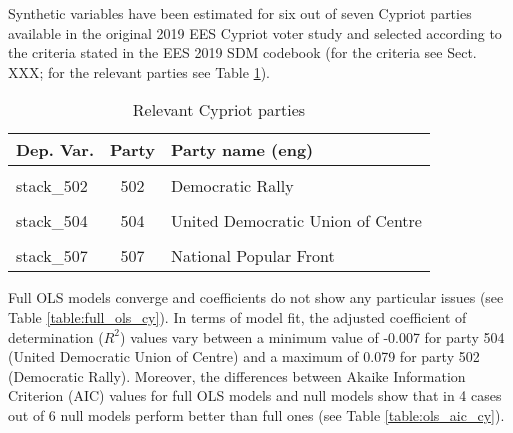 \documentclass[
]{article}
\begin{document}
Synthetic variables have been estimated for six out of seven Cypriot parties available in the original
2019 EES Cypriot voter study and selected according to the criteria stated in the EES 2019 SDM codebook (for the criteria see Sect. XXX; for the relevant parties see Table \ref{table:relprty_tab_cy}).

\begin{table}[!h]

\caption{\label{tab:unnamed-chunk-39}Relevant Cypriot parties \label{table:relprty_tab_cy}}
\centering
\begin{tabular}[t]{lcl}
\toprule
Dep. Var. & Party & Party name (eng)\\
\midrule
\cellcolor{gray!6}{stack\_501} & \cellcolor{gray!6}{501} & \cellcolor{gray!6}{Progressive Party of the Working People}\\
stack\_502 & 502 & Democratic Rally\\
\cellcolor{gray!6}{stack\_503} & \cellcolor{gray!6}{503} & \cellcolor{gray!6}{Democratic Party}\\
stack\_504 & 504 & United Democratic Union of Centre\\
\cellcolor{gray!6}{stack\_505} & \cellcolor{gray!6}{505} & \cellcolor{gray!6}{Ecological and Environmental Movement (Cyprus Green Party)}\\
\addlinespace
stack\_507 & 507 & National Popular Front\\
\bottomrule
\end{tabular}
\end{table}

Full OLS models converge and coefficients do not show any particular issues (see Table
\ref{table:full_ols_cy}).
In terms of model fit, the adjusted coefficient of determination (\(R^2\)) values vary between
a minimum value of -0.007
for party 504
(United Democratic Union of Centre)
and a maximum of 0.079
for party 502
(Democratic Rally).
Moreover, the differences between Akaike Information Criterion (AIC) values for full OLS models and null
models show that in 4 cases out of 6 null models perform better than full ones (see Table
\ref{table:ols_aic_cy}).
\end{document}
